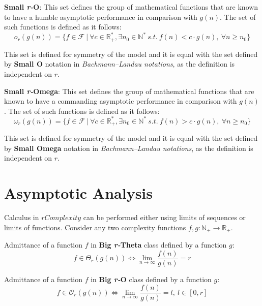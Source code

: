\begin{definition}
    \textbf{Small \textit{r-}O}:
    This set defines the group of mathematical functions that are known to have a humble
    asymptotic performance in comparison with  $g(n)$. The set of such functions is defined as it follows:
    \[o_{r}(g(n)) = \lbrace f \in \mathcal{F}\ |\ \forall c \in \mathbb{R}^{*}_{+}, \exists n_{0} \in \mathbb{N}^{*}\ s.t.\  f(n) < c \cdot g(n),\  \forall n \geq n_{0} \rbrace\]
\end{definition}
\begin{remark}
    This set is defined for symmetry of the model and it is equal with the set defined by \textbf{Small O} notation in \textit{Bachmann–Landau notations}, as the definition is independent on $r$.
\end{remark}

\begin{definition}
    \textbf{Small \textit{r-}Omega}:
    This set defines the group of mathematical functions that are known to have a commanding asymptotic performance in comparison with  $g(n)$.
    The set of such functions is defined as it follows:
    \[\omega_{r}(g(n)) = \lbrace f \in \mathcal{F}\ |\ \forall c \in \mathbb{R}^{*}_{+}, \exists n_{0} \in \mathbb{N}^{*}\ s.t.\  f(n) > c \cdot g(n),\  \forall n \geq n_{0} \rbrace\]
\end{definition}
\begin{remark}
    This set is defined for symmetry of the model and it is equal with the set defined by \textbf{Small Omega} notation in \textit{Bachmann–Landau notations}, as the definition is independent on $r$.
\end{remark}


\section{Asymptotic Analysis}
Calculus in $rComplexity$ can be performed either using limits of sequences or limits of functions. Consider any two complexity functions $f,g:\mathbb{N}_{+}\longrightarrow\mathbb{R}_{+}$.

\begin{theorem}
    Admittance of a function $f$ in \textbf{Big \textit{r-}Theta} class defined by a function $g$:
    \[ f \in \Theta_{r}(g(n)) \Leftrightarrow \lim_{n\to\infty} \dfrac{f(n)}{g(n)} = r \]
\end{theorem}

\begin{theorem}
    Admittance of a function $f$ in \textbf{Big \textit{r-}O} class defined by a function $g$:
    \[ f \in \mathcal{O}_{r}(g(n)) \Leftrightarrow \lim_{n\to\infty} \dfrac{f(n)}{g(n)} = l,\ l \in \left[ 0, r \right] \]
\end{theorem}

